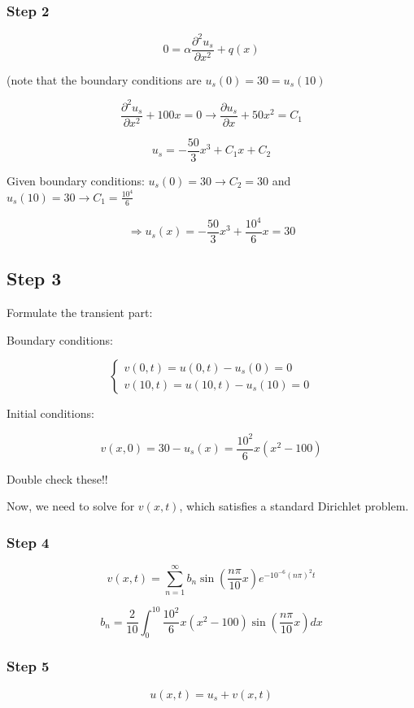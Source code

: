 \documentclass{article}
\begin{document}
\subsubsection{Step 2}

$$0 = \alpha \frac{\partial^2 u_s}{\partial x^2} + q(x)$$

(note that the boundary conditions are $u_s(0) = 30 = u_s(10)$

$$\frac{\partial^2 u_s}{\partial x^2} + 100x = 0 \longrightarrow \frac{\partial u_s}{\partial x} + 50 x^2 = C_1$$

$$u_s = - \frac{50}{3} x^3 + C_1 x + C_2$$

Given boundary conditions: $u_s(0) = 30 \longrightarrow C_2 = 30$ and $u_s(10) = 30 \longrightarrow C_1 = \frac{10^4}{6}$

$$\Rightarrow u_s(x) = - \frac{50}{3} x^3 + \frac{10^4}{6} x = 30$$

\subsection{Step 3}

Formulate the transient part:

Boundary conditions:

$$\left\{ \begin{matrix} v(0,t) = u(0,t) - u_s(0) = 0 \\ v(10,t) = u(10,t) - u_s(10) = 0 \end{matrix} \right.$$

Initial conditions:

$$v(x,0) = 30 - u_s (x) = \frac{10^2}{6} x (x^2 - 100)$$

Double check these!!

Now, we need to solve for $v(x,t)$, which satisfies a standard Dirichlet problem. 

\subsubsection{Step 4}

$$v(x,t) = \sum_{n = 1}^\infty b_n \sin \left( \frac{n \pi}{10} x \right) e^{- 10^{-6} (n \pi)^2 t}$$

$$b_n = \frac{2}{10} \int_0^{10} \frac{10^2}{6} x (x^2 - 100) \sin( \frac{n \pi}{10} x) dx$$

\subsubsection{Step 5}

$$u(x,t) = u_s + v(x,t)$$
\end{document}
